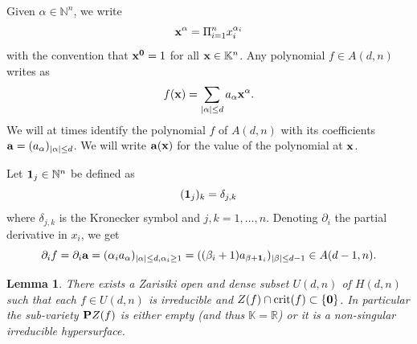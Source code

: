 \documentclass[11pt]{amsart}
\newtheorem{lemma}[theorem]{Lemma}
\newcommand{\field}[1]{\mathbb{#1}}
\newcommand{\K}{\field{K}}
\newcommand{\N}{\field{N}}
\newcommand{\R}{\field{R}}
\newcommand{\aph}{{\alpha}}
\newcommand{\bun}{{\bf 1}}
\newcommand{\ba}{{\bf a}}
\newcommand{\bbo}{{\bf 0}}
\newcommand{\bP}{{\bf P}}
\newcommand{\bx}{{\bf x}}
\newcommand{\crit}{{\rm crit}}
\newcommand{\dd}{{\partial}}
\newcommand{\dlt}{{\delta}}
\numberwithin{equation}{section}
\numberwithin{equation}{section}
\begin{document}
\medskip
Given $\aph\in \N^n$, we write 
$$
\bx^\aph = \Pi_{i=1}^n x_i^{\aph_i}
$$
with the convention that $\bx^\bbo = 1$ for all $\bx \in \K^n$. 
Any polynomial $f \in A(d,n)$ writes as
$$
f (\bx) = \sum_{|\aph|\leq d} a_\aph \bx^\aph.
$$
We will at times identify the polynomial $f$ of $A(d,n)$ with its 
coefficients $\ba = (a_\aph)_{|\aph| \leq d}$. 
We will write $\ba(\bx)$ for the value of the polynomial at $\bx$.

\bigskip\noindent
Let $\bun_j \in \N^n$ be defined as 
$$
(\bun_j)_k = \dlt_{j,k}
$$
where $\dlt_{j,k}$ is the Kronecker symbol and $j,k=1,\ldots,n$.
Denoting $\dd_i$ the partial derivative in $x_i$, we get 
$$
\dd_i f = \dd_i\ba = (\aph_i a_\aph)_{|\aph| \leq d, \aph_i \geq 
1} = ((\beta_i+1)a_{\beta+\bun_i})_{|\beta|\leq d-1}\in A(d-1,n).
$$
%
%
\begin{lemma}\label{lem:hyper-homog-gen}
There exists a Zarisiki open and dense subset $U(d,n)$ of $H(d,n)$
such that each $f\in U(d,n)$ is irreducible and $Z(f) \cap \crit(f) 
\subset \{\bbo\}$. In particular the sub-variety $\bP Z(f)$ is either 
empty (and thus $\K = \R$) or it is a  non-singular irreducible hypersurface.
\end{lemma}
%
%
\end{document}
